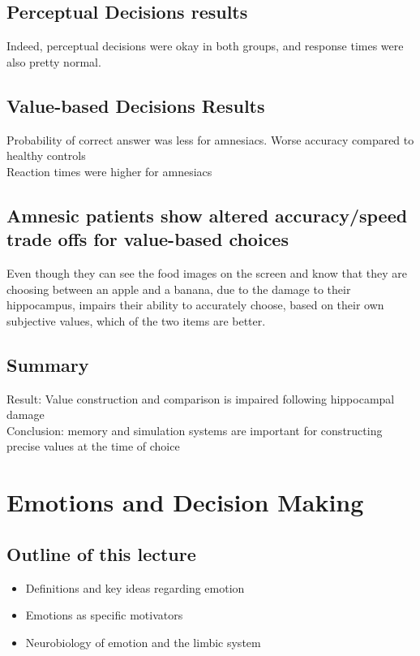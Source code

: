 \subsection{Perceptual Decisions results}
Indeed, perceptual decisions were okay in both groups, and response times were also pretty normal. 

\subsection{Value-based Decisions Results}
Probability of correct answer was less for amnesiacs. Worse accuracy compared to healthy controls
\\Reaction times were higher for amnesiacs
\subsection{Amnesic patients show altered accuracy/speed trade offs for value-based choices}
Even though they can see the food images on the screen and know that they are choosing between an apple and a banana, due to the damage to their hippocampus, impairs their ability to accurately choose, based on their own subjective values, which of the two items are better.
\subsection{Summary}
Result: Value construction and comparison is impaired following hippocampal damage
\\Conclusion: memory and simulation systems are important for constructing precise
values at the time of choice
\section{Emotions and Decision Making}
\subsection{Outline of this lecture}
\begin{itemize}
    \item Definitions and key ideas regarding emotion
    \item Emotions as specific motivators
    \item Neurobiology of emotion and the limbic system
\end{itemize}

